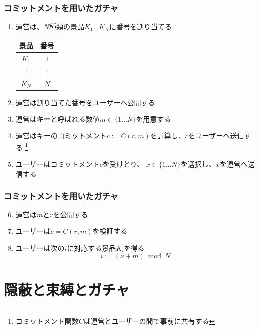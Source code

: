 \begin{frame}
  \frametitle{コミットメントを用いたガチャ}
  
  \begin{enumerate}
    \item<2-> \label{item:assign}
      運営は、$N$種類の景品$K_1 \dots K_N$に番号を割り当てる
      \begin{table}[h]
        \begin{tabular}{c|c}
          景品 & 番号 \\
          \hline \hline
          $K_1$ & $1$ \\
          $\vdots$ & $\vdots$ \\
          $K_N$ & $N$ \\
        \end{tabular}
      \end{table}
    \item<3-> 運営は割り当てた番号をユーザーへ公開する
    \item<4-> 運営は\textbf{キー}と呼ばれる数値$m \in \{1 \dots N\}$を用意する
    \item<5-> 運営はキーのコミットメント$c := C(r, m)$を計算し、$c$をユーザーへ送信する%
      \footnote[frame]{コミットメント関数$C$は運営とユーザーの間で事前に共有する}
    \item<6-> ユーザーはコミットメント$c$を受けとり、
      $x \in \{1 \dots N\}$を選択し、$x$を運営へ送信する
  \end{enumerate}
\end{frame}

\begin{frame}
  \frametitle{コミットメントを用いたガチャ}

  \begin{enumerate}
    \setcounter{enumi}{5}
    \item<1-> 運営は$m$と$r$を公開する
    \item<2-> ユーザーは$c = C(r, m)$を検証する
    \item<3-> ユーザーは次の$i$に対応する景品$K_i$を得る
      \[
       i := (x + m) \bmod N
     \]
  \end{enumerate}
\end{frame}

\section{隠蔽と束縛とガチャ}

